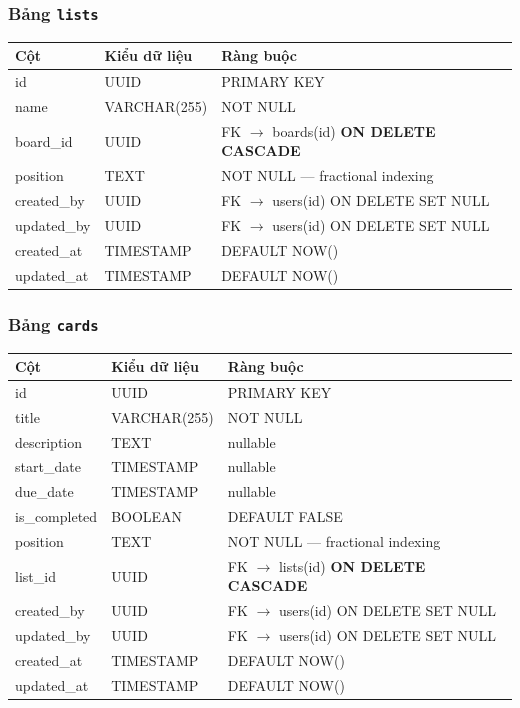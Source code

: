 \subsubsection*{Bảng \texttt{lists}}
\begin{table}[H]
\centering
\begin{tabularx}{\textwidth}{|l|l|X|}
\hline
\rowcolor{gray!20}
\textbf{Cột} & \textbf{Kiểu dữ liệu} & \textbf{Ràng buộc} \\
\hline
id & UUID & PRIMARY KEY \\
\hline
name & VARCHAR(255) & NOT NULL \\
\hline
board\_id & UUID & FK $\rightarrow$ boards(id) \textbf{ON DELETE CASCADE} \\
\hline
position & TEXT & NOT NULL — fractional indexing \\
\hline
created\_by & UUID & FK $\rightarrow$ users(id) ON DELETE SET NULL \\
\hline
updated\_by & UUID & FK $\rightarrow$ users(id) ON DELETE SET NULL \\
\hline
created\_at & TIMESTAMP & DEFAULT NOW() \\
\hline
updated\_at & TIMESTAMP & DEFAULT NOW() \\
\hline
\end{tabularx}
\end{table}

\subsubsection*{Bảng \texttt{cards}}
\begin{table}[H]
\centering
\begin{tabularx}{\textwidth}{|l|l|X|}
\hline
\rowcolor{gray!20}
\textbf{Cột} & \textbf{Kiểu dữ liệu} & \textbf{Ràng buộc} \\
\hline
id & UUID & PRIMARY KEY \\
\hline
title & VARCHAR(255) & NOT NULL \\
\hline
description & TEXT & nullable \\
\hline
start\_date & TIMESTAMP & nullable \\
\hline
due\_date & TIMESTAMP & nullable \\
\hline
is\_completed & BOOLEAN & DEFAULT FALSE \\
\hline
position & TEXT & NOT NULL — fractional indexing \\
\hline
list\_id & UUID & FK $\rightarrow$ lists(id) \textbf{ON DELETE CASCADE} \\
\hline
created\_by & UUID & FK $\rightarrow$ users(id) ON DELETE SET NULL \\
\hline
updated\_by & UUID & FK $\rightarrow$ users(id) ON DELETE SET NULL \\
\hline
created\_at & TIMESTAMP & DEFAULT NOW() \\
\hline
updated\_at & TIMESTAMP & DEFAULT NOW() \\
\hline
\end{tabularx}
\end{table}

